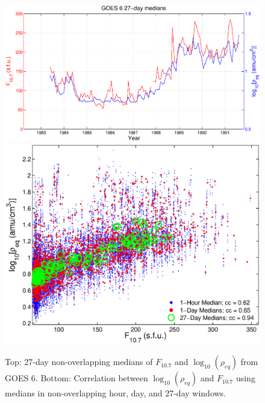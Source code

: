 \documentclass[12pt]{article}
\begin{document}
\begin{figure}[htp!]
\centering
\includegraphics[scale=0.40]{figures/F107MD27d-GOES6.eps}
\includegraphics[scale=0.40]{figures/ccplot-GOES6.eps}
\caption{Top: 27-day non-overlapping medians of $F_{10.7}$ and $\log_{10}(\rho_{eq})$ from GOES 6. Bottom: Correlation between $\log_{10}(\rho_{eq})$ and $F_{10.7}$ using medians in non-overlapping hour, day, and 27-day windows.}
\label{fig:ccplot}
\end{figure}
\clearpage
\end{document}
